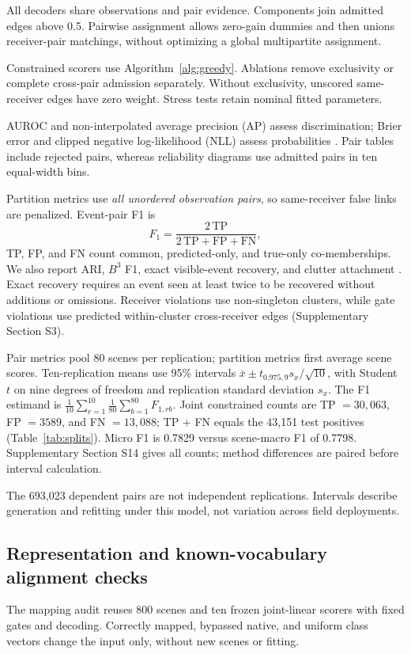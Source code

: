 All decoders share observations and pair evidence. Components join admitted edges above 0.5. Pairwise assignment allows zero-gain dummies and then unions receiver-pair matchings, without optimizing a global multipartite assignment.

Constrained scorers use Algorithm~\ref{alg:greedy}. Ablations remove exclusivity or complete cross-pair admission separately. Without exclusivity, unscored same-receiver edges have zero weight. Stress tests retain nominal fitted parameters.

AUROC and non-interpolated average precision (AP) assess discrimination; Brier error and clipped negative log-likelihood (NLL) assess probabilities \cite{silvafilho2023,miller2024}. Pair tables include rejected pairs, whereas reliability diagrams use admitted pairs in ten equal-width bins.

Partition metrics use \emph{all unordered observation pairs}, so same-receiver false links are penalized. Event-pair F1 is
\begin{equation}
 F_1=\frac{2\,\mathrm{TP}}{2\,\mathrm{TP}+\mathrm{FP}+\mathrm{FN}},\label{eq:f1}
\end{equation}
TP, FP, and FN count common, predicted-only, and true-only co-memberships. We also report ARI, $B^3$ F1, exact visible-event recovery, and clutter attachment \cite{hassan2024,miller2024}. Exact recovery requires an event seen at least twice to be recovered without additions or omissions. Receiver violations use non-singleton clusters, while gate violations use predicted within-cluster cross-receiver edges (Supplementary Section S3).

Pair metrics pool 80 scenes per replication; partition metrics first average scene scores. Ten-replication means use 95\% intervals $\bar x\pm t_{0.975,9}s_x/\sqrt{10}$, with Student $t$ on nine degrees of freedom and replication standard deviation $s_x$. The F1 estimand is $\frac1{10}\sum_{r=1}^{10}\frac1{80}\sum_{b=1}^{80}F_{1,rb}$. Joint constrained counts are TP $=30{,}063$, FP $=3589$, and FN $=13{,}088$; TP $+$ FN equals the 43,151 test positives (Table~\ref{tab:splits}). Micro F1 is 0.7829 versus scene-macro F1 of 0.7798. Supplementary Section S14 gives all counts; method differences are paired before interval calculation.

The 693,023 dependent pairs are not independent replications. Intervals describe generation and refitting under this model, not variation across field deployments.

\subsection{Representation and known-vocabulary alignment checks}\label{sec:alignment_audit}
The mapping audit reuses 800 scenes and ten frozen joint-linear scorers with fixed gates and decoding. Correctly mapped, bypassed native, and uniform class vectors change the input only, without new scenes or fitting.

